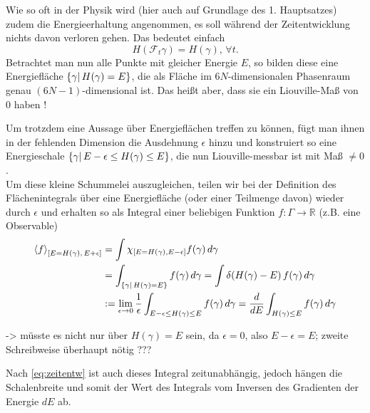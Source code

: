 Wie so oft in der Physik wird (hier auch auf Grundlage des 1. Hauptsatzes) zudem die Energieerhaltung angenommen, es soll während der Zeitentwicklung nichts davon verloren gehen. Das bedeutet einfach
\begin{equation}\label{key}
H(\mathcal{F}_t \gamma) = H(\gamma), \, \forall t .
\end{equation}
Betrachtet man nun alle Punkte mit gleicher Energie $E$, so bilden diese eine Energiefläche $\qty{\gamma | \, H(\gamma) = E}$, die als Fläche im $6N$-dimensionalen Phasenraum genau $(6N-1)$-dimensional ist. Das heißt aber, dass sie ein Liouville-Maß von 0 haben !

Um trotzdem eine Aussage über Energieflächen treffen zu können, fügt man ihnen in der fehlenden Dimension die Ausdehnung $\epsilon$ hinzu und konstruiert so eine Energieschale $\qty{\gamma | \, E-\epsilon \leq H(\gamma) \leq E}$, die nun Liouville-messbar ist mit Maß $\neq 0$.\\
Um diese kleine Schummelei auszugleichen, teilen wir bei der Definition des Flächenintegrals über eine Energiefläche (oder einer Teilmenge davon) wieder durch $\epsilon$ und erhalten so als Integral einer beliebigen Funktion $f: \Gamma \rightarrow \mathbb{R}$ (z.B. eine Observable) 
\begin{align}\label{eq:energy}
\expval{f}_{\qty[E = H(\gamma), \, E + \epsilon]} &= \int \chi_{\qty[E = H(\gamma), E - \epsilon]} f(\gamma) \, d\gamma
\notag\\
&= \int_{\qty{\gamma | \, H(\gamma) = E}} f(\gamma) \, d\gamma = \int \delta(H(\gamma) - E) \, f(\gamma) \, d\gamma
\notag\\
&:= \lim_{\epsilon \rightarrow 0} \frac{1}{\epsilon} \int_{E-\epsilon \leq H(\gamma) \leq E} f(\gamma) \, d\gamma = \dv{E} \int_{H(\gamma) \leq E} f(\gamma) \, d\gamma
\end{align}

-> müsste es nicht nur über $H(\gamma) = E$ sein, da $\epsilon = 0$, also $E - \epsilon = E$; zweite Schreibweise überhaupt nötig ???


Nach \eqref{eq:zeitentw} ist auch dieses Integral zeitunabhängig, jedoch hängen die Schalenbreite und somit der Wert des Integrals vom Inversen des Gradienten der Energie $dE$ ab.

	\\

